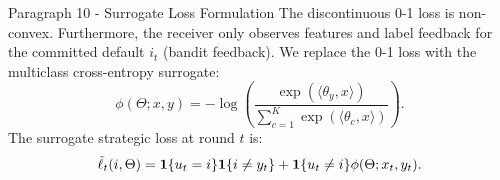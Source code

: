 \begin{faqblock}
\faqanswers
{}
\end{faqblock}

\begin{sourceblock}{Paragraph 10 - Surrogate Loss Formulation}
The discontinuous 0-1 loss is non-convex. Furthermore, the receiver only observes features and label feedback for the committed default $i_t$ (bandit feedback). We replace the 0-1 loss with the multiclass cross-entropy surrogate:
\begin{equation}
    \label{eq:cross_entropy_surrogate}
    \phi(\Theta; x, y) = -\log \left( \frac{\exp(\langle \theta_y, x \rangle)}{\sum_{c=1}^K \exp(\langle \theta_c, x \rangle)} \right).
\end{equation}
The surrogate strategic loss at round $t$ is:
\begin{equation}
    \label{eq:surrogate_strategic_loss_t}
    \tilde{\ell}_t(i, \Theta) = \mathbf{1}\{u_t = i\}\mathbf{1}\{i \ne y_t\} + \mathbf{1}\{u_t \ne i\} \phi(\Theta; x_t, y_t).
\end{equation}
\end{sourceblock}

\begin{faqblock}
\faqanswers
{}
\end{faqblock}

